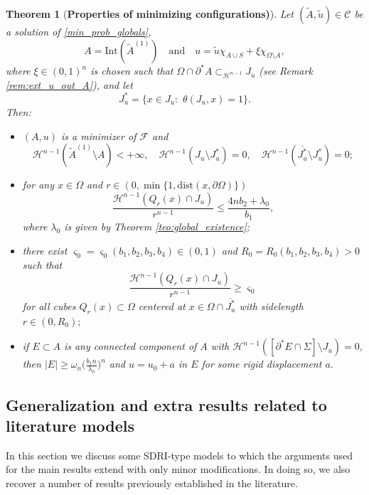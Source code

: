 \documentclass[reqno]{amsart}
\numberwithin{equation}{section}
\theoremstyle{plain}
\newtheorem{theorem}{Theorem}[section]
\theoremstyle{definition}
\newcommand{\cH}{\mathcal{H}}
\newcommand{\cF}{\mathcal{F}}
\newcommand{\p}{\partial}
\newcommand{\cl}[1]{\overline{#1}}
\newcommand{\bound}{b}
\renewcommand{\tilde}{\widetilde}
\newcommand{\dist}{\mathrm{dist}}
\newcommand{\Int}[1]{\mathrm{Int}(#1)}
\newcommand{\admissible}{\mathcal{C}}
\begin{document}
\begin{theorem}[\textbf{Properties of minimizing configurations)}]\label{teo:regularity_of_minimizers}  
Let $(\tilde A,\tilde u)\in \admissible$ be a solution of \eqref{min_prob_globals},
$$
A=\Int{\tilde A^{(1)}}\quad\text{and}\quad u = \tilde u\chi_{A\cup S} + \xi \chi_{\Omega\setminus A},
$$
where $\xi\in(0,1)^n$ is chosen such that $\Omega\cap\p^* A\subset_{\cH^{n-1}} J_u$ (see Remark \ref{rem:ext_u_out_A}), and let
$$
J_u^*=\{x\in J_u:\,\, \theta(J_u,x)=1\}.
$$
Then: 

\begin{itemize}[left=12pt]
\item[\rm(i)]  $(A,u)$ is a minimizer of $\cF$ and 
$$
\cH^{n-1}(\tilde A^{(1)} \setminus A)<+\infty,\quad 
\cH^{n-1}(J_u\setminus J_u^*)=0,\quad
\cH^{n-1}(\cl{J_u^*}\setminus J_u^*)=0; 
$$

\item[\rm(ii)]  for any $x\in\Omega$ and $r\in(0,\min\{1,\dist(x,\p \Omega)\})$
%
$$
\frac{\cH^{n-1}(Q_r(x)\cap J_u)}{r^{n-1}} \le \frac{4n\bound_2 + \lambda_0}{\bound_1},
$$
where $\lambda_0$ is given by Theorem \ref{teo:global_existence}; 

\item[\rm(iii)]  there exist $\varsigma_0=\varsigma_0(\bound_1,\bound_2,\bound_3,\bound_4)\in(0,1)$ and $R_0=R_0(\bound_1,\bound_2,\bound_3,\bound_4)>0$  such that 
$$
\frac{\cH^{n-1}(Q_r(x)\cap J_u)}{r^{n-1}} \ge \varsigma_0
$$
for all cubes $Q_r(x)\subset\Omega$ centered at $x\in \Omega\cap \cl{J_u^*}$ with sidelength $r\in(0,R_0);$ 

\item[\rm(iv)]   if $E\subset A$ is any connected component of $A$ with $\cH^{n-1}([\p^* E\cap\Sigma] \setminus J_u)=0,$ then $|E|\ge\omega_n \big(\frac{\bound_1n}{\lambda_0}\big)^n$  and $u=u_0+a$ in $E$   for some rigid displacement $a.$
\end{itemize}
%
\end{theorem}
 
\subsection{Generalization and extra results related to literature models}\label{subsec:generalization}

In this section we discuss some SDRI-type models to which the arguments used for the main results extend with only minor modifications. In doing so, we also recover a number of results previously established in the literature.
\end{document}
